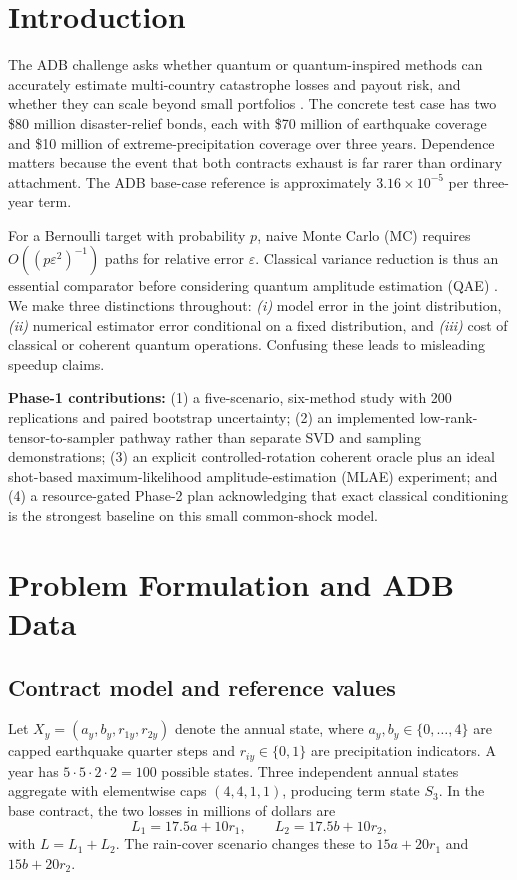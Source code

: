 \documentclass[10pt,conference]{IEEEtran}
\begin{document}
\section{Introduction}
The ADB challenge asks whether quantum or quantum-inspired methods can accurately estimate multi-country catastrophe losses and payout risk, and whether they can scale beyond small portfolios \cite{adb}. The concrete test case has two \$80 million disaster-relief bonds, each with \$70 million of earthquake coverage and \$10 million of extreme-precipitation coverage over three years. Dependence matters because the event that both contracts exhaust is far rarer than ordinary attachment. The ADB base-case reference is approximately $3.16\times10^{-5}$ per three-year term.

For a Bernoulli target with probability $p$, naive Monte Carlo (MC) requires $O((p\varepsilon^2)^{-1})$ paths for relative error $\varepsilon$. Classical variance reduction is thus an essential comparator before considering quantum amplitude estimation (QAE) \cite{glasserman,brassard,montanaro}. We make three distinctions throughout: \emph{(i)} model error in the joint distribution, \emph{(ii)} numerical estimator error conditional on a fixed distribution, and \emph{(iii)} cost of classical or coherent quantum operations. Confusing these leads to misleading speedup claims.

\textbf{Phase-1 contributions:} (1) a five-scenario, six-method study with 200 replications and paired bootstrap uncertainty; (2) an implemented low-rank-tensor-to-sampler pathway rather than separate SVD and sampling demonstrations; (3) an explicit controlled-rotation coherent oracle plus an ideal shot-based maximum-likelihood amplitude-estimation (MLAE) experiment; and (4) a resource-gated Phase-2 plan acknowledging that exact classical conditioning is the strongest baseline on this small common-shock model.

\section{Problem Formulation and ADB Data}
\subsection{Contract model and reference values}
Let $X_y=(a_y,b_y,r_{1y},r_{2y})$ denote the annual state, where $a_y,b_y\in\{0,\ldots,4\}$ are capped earthquake quarter steps and $r_{iy}\in\{0,1\}$ are precipitation indicators. A year has $5\cdot5\cdot2\cdot2=100$ possible states. Three independent annual states aggregate with elementwise caps $(4,4,1,1)$, producing term state $S_3$. In the base contract, the two losses in millions of dollars are
\begin{equation}
L_1=17.5a+10r_1,\qquad L_2=17.5b+10r_2,
\label{eq:contract}
\end{equation}
with $L=L_1+L_2$. The rain-cover scenario changes these to $15a+20r_1$ and $15b+20r_2$.
\end{document}
